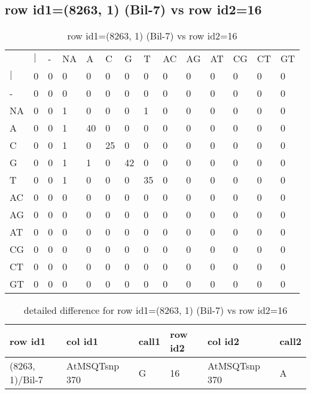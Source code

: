 \subsection{row id1=(8263, 1) (Bil-7) vs row id2=16}
\begin{center}
\begin{longtable}{|l|l|l|l|l|l|l|l|l|l|l|l|l|l|}
\caption{row id1=(8263, 1) (Bil-7) vs row id2=16} \label{table_dm212}\\
\hline
\\
\hline
&$|$&-&NA&A&C&G&T&AC&AG&AT&CG&CT&GT\\
$|$&0&0&0&0&0&0&0&0&0&0&0&0&0\\
-&0&0&0&0&0&0&0&0&0&0&0&0&0\\
NA&0&0&1&0&0&0&1&0&0&0&0&0&0\\
A&0&0&1&40&0&0&0&0&0&0&0&0&0\\
C&0&0&1&0&25&0&0&0&0&0&0&0&0\\
G&0&0&1&1&0&42&0&0&0&0&0&0&0\\
T&0&0&1&0&0&0&35&0&0&0&0&0&0\\
AC&0&0&0&0&0&0&0&0&0&0&0&0&0\\
AG&0&0&0&0&0&0&0&0&0&0&0&0&0\\
AT&0&0&0&0&0&0&0&0&0&0&0&0&0\\
CG&0&0&0&0&0&0&0&0&0&0&0&0&0\\
CT&0&0&0&0&0&0&0&0&0&0&0&0&0\\
GT&0&0&0&0&0&0&0&0&0&0&0&0&0\\
\hline
\end{longtable}
\end{center}

\begin{center}
\begin{longtable}{|l|l|l|l|l|l|}
\caption{detailed difference for row id1=(8263, 1) (Bil-7) vs row id2=16} \label{table_dm213}\\
\hline
row id1&col id1&call1&row id2&col id2&call2\\
\hline
(8263, 1)/Bil-7&AtMSQTsnp 370&G&16&AtMSQTsnp 370&A\\
\hline
\end{longtable}
\end{center}

